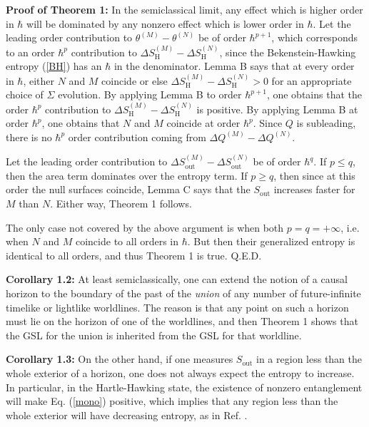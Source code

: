 \documentclass{article}
\begin{document}
\textbf{Proof of Theorem 1:} In the semiclassical limit, any effect which is higher order in $\hbar$ will be dominated by any nonzero effect which is lower order in $\hbar$.  Let the leading order contribution to $\theta^{(M)} - \theta^{(N)}$ be of order $\hbar^{p + 1}$, which 
corresponds to an order $\hbar^p$ contribution to $\Delta S_\mathrm{H}^{(M)} - \Delta S_\mathrm{H}^{(N)}$, since the Bekenstein-Hawking entropy (\ref{BH}) has an $\hbar$ in the denominator.  Lemma B says that at every order in $\hbar$, either $N$ and $M$ coincide or else $\Delta S_\mathrm{H}^{(M)} - \Delta S_\mathrm{H}^{(N)} > 0$ for an appropriate choice of $\Sigma$ evolution.  By applying Lemma B to order $\hbar^{p + 1}$, one obtains that the order $\hbar^p$ contribution to $\Delta S_\mathrm{H}^{(M)} - \Delta S_\mathrm{H}^{(N)}$ is positive.  By applying Lemma B at order $\hbar^p$, one obtains that $N$ and $M$ coincide at order $\hbar^p$.  Since $Q$ is subleading, there is no $\hbar^p$ order contribution coming from $\Delta Q^{(M)} - \Delta Q^{(N)}$.

Let the leading order contribution to $\Delta S_\mathrm{out}^{(M)} - \Delta S_\mathrm{out}^{(N)}$ be of order $\hbar^q$.  If $p \le q$, then the area term dominates over the entropy term.  If $p \ge q$, then since at this order the null surfaces coincide, Lemma C says that the $S_\mathrm{out}$ increases faster for $M$ than $N$.  Either way, Theorem 1 follows.

The only case not covered by the above argument is when both $p = q = +\infty$, i.e. when $N$ and $M$ coincide to all orders in $\hbar$.  But then their generalized entropy is identical to all orders, and thus Theorem 1 is true.  Q.E.D.

\textbf{Corollary 1.2:} At least semiclassically, one can extend the notion of a causal horizon to the boundary of the past of the \emph{union} of any number of future-infinite timelike or lightlike worldlines.  The reason is that any point on such a horizon must lie on the horizon of one of the worldlines, and then Theorem 1 shows that the GSL for the union is inherited from the GSL for that worldline.

\textbf{Corollary 1.3:} On the other hand, if one measures $S_\mathrm{out}$ in a region less than the whole exterior of a horizon, one does not always expect the entropy to increase.  In particular, in the Hartle-Hawking state, the existence of nonzero entanglement will make Eq. (\ref{mono}) positive, which implies that any region less than the whole exterior will have decreasing entropy, as in Ref. \cite{deriv}.
\end{document}
